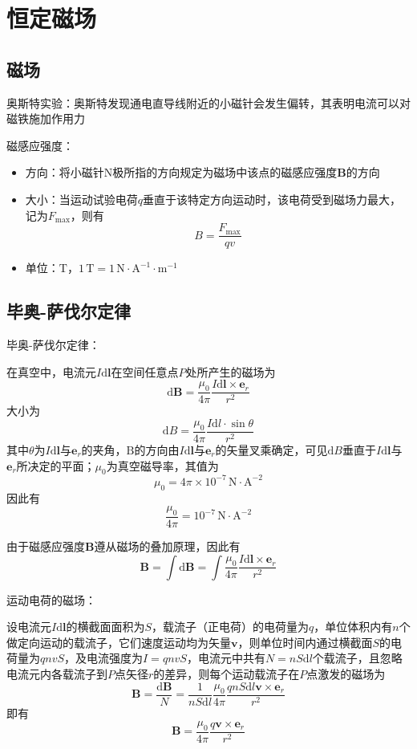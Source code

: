 \documentclass[12pt, a4paper, twoside]{ctexbook}
\begin{document}
\chapter{恒定磁场}
\newpage
\section{磁场}
{\sonti 奥斯特实验}：奥斯特发现通电直导线附近的小磁针会发生偏转，其表明电流可以对磁铁施加作用力

{\sonti 磁感应强度}：
\begin{itemize}
    \item 方向：将小磁针$\mathrm{N}$极所指的方向规定为磁场中该点的磁感应强度$\boldsymbol{B}$的方向
    \item 大小：当运动试验电荷$q$垂直于该特定方向运动时，该电荷受到磁场力最大，记为$F_\mathrm{max}$，则有
    $$
    B=\frac{F_\mathrm{max}}{qv}
    $$
    \item 单位：$\mathrm{T}$，$1\,\mathrm{T}=1\,\mathrm{N}\cdot\mathrm{A}^{-1}\cdot\mathrm{m}^{-1}$
\end{itemize}
\section{毕奥-萨伐尔定律}
{\sonti 毕奥-萨伐尔定律}：

在真空中，电流元$I\mathrm{d}\boldsymbol{l}$在空间任意点$P$处所产生的磁场为
$$
\mathrm{d}\boldsymbol{B}=\frac{\mu_0}{4\pi}\frac{I\mathrm{d}\boldsymbol{l}\times\boldsymbol{e}_r}{r^2}
$$
大小为
$$
\mathrm{d}B=\frac{\mu_0}{4\pi}\frac{I\mathrm{d}l\cdot\sin\theta}{r^2}
$$
其中$\theta$为$I\mathrm{d}\boldsymbol{l}$与$\boldsymbol{e}_r$的夹角，$\mathrm{B}$的方向由$I\mathrm{d}\boldsymbol{l}$与$\boldsymbol{e}_r$的矢量叉乘确定，可见$\mathrm{d}B$垂直于$I\mathrm{d}\boldsymbol{l}$与$\boldsymbol{e}_r$所决定的平面；$\mu_0$为真空磁导率，其值为
$$
\mu_0=4\pi\times10^{-7}\,\mathrm{N}\cdot\mathrm{A}^{-2}
$$
因此有
$$
\frac{\mu_0}{4\pi}=10^{-7}\,\mathrm{N}\cdot\mathrm{A}^{-2}
$$

由于磁感应强度$\boldsymbol{B}$遵从磁场的叠加原理，因此有
$$
\boldsymbol{B}=\int\mathrm{d}\boldsymbol{B}=\int\frac{\mu_0}{4\pi}\frac{I\mathrm{d}\boldsymbol{l}\times\boldsymbol{e}_r}{r^2}
$$

{\sonti 运动电荷的磁场}：

设电流元$I\mathrm{d}\boldsymbol{l}$的横截面面积为$S$，载流子（正电荷）的电荷量为$q$，单位体积内有$n$个做定向运动的载流子，它们速度运动均为矢量$\boldsymbol{v}$，则单位时间内通过横截面$S$的电荷量为$qnvS$，及电流强度为$I=qnvS$，电流元中共有$N=nS\mathrm{d}l$个载流子，且忽略电流元内各载流子到$P$点矢径$r$的差异，则每个运动载流子在$P$点激发的磁场为
$$
\boldsymbol{B}=\frac{\mathrm{d}\boldsymbol{B}}{N}=\frac{1}{nS\mathrm{d}l}\frac{\mu_0}{4\pi}\frac{qnS\mathrm{d}l\boldsymbol{v}\times\boldsymbol{e}_r}{r^2}
$$
即有
$$
\boldsymbol{B}=\frac{\mu_0}{4\pi}\frac{q\boldsymbol{v}\times\boldsymbol{e}_r}{r^2}
$$
\end{document}
